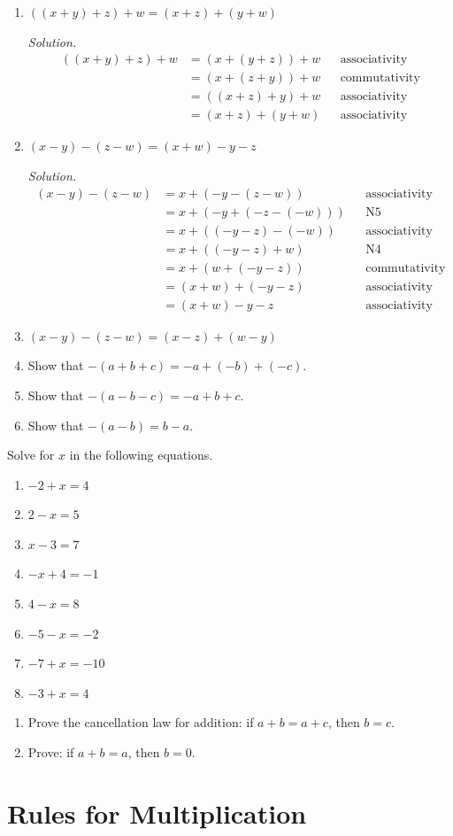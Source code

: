 \documentclass[11pt]{article}
\begin{document}
\begin{enumerate}
  \item $((x + y) + z) + w = (x + z) + (y + w)$

    \emph{Solution.}
    \begin{align*}
      ((x + y) + z) + w
        &= (x + (y + z)) + w && \text{associativity} \\
        &= (x + (z + y)) + w && \text{commutativity} \\
        &= ((x + z) + y) + w && \text{associativity} \\
        &= (x + z) + (y + w) && \text{associativity}
    \end{align*}

  \item $(x - y) - (z - w) = (x + w) - y - z$

    \emph{Solution.}
    \begin{align*}
      (x - y) - (z - w)
        &= x + (-y - (z - w)) && \text{associativity} \\
        &= x + (-y + (-z - (-w))) && \text{N5} \\
        &= x + ((-y - z) - (-w)) && \text{associativity} \\
        &= x + ((-y - z) + w) && \text{N4} \\
        &= x + (w + (-y - z)) && \text{commutativity} \\
        &= (x + w) + (-y - z) && \text{associativity} \\
        &= (x + w) - y - z && \text{associativity}
    \end{align*}

  \item $(x - y) - (z - w) = (x - z) + (w - y)$
  \item Show that $-(a + b + c) = -a + (-b) + (-c)$.
  \item Show that $-(a - b - c) = -a + b + c$.
  \item Show that $-(a - b) = b - a$.
\end{enumerate}

Solve for $x$ in the following equations.

\begin{enumerate}[resume]
  \item $-2 + x = 4$
  \item $2 - x = 5$
  \item $x - 3 = 7$
  \item $-x + 4 = -1$
  \item $4 - x = 8$
  \item $-5 - x = -2$
  \item $-7 + x = -10$
  \item $-3 + x = 4$
\end{enumerate}

\begin{enumerate}[resume]
  \item Prove the cancellation law for addition:
    if $a + b = a + c$, then $b = c$.
  \item Prove: if $a + b = a$, then $b = 0$.
\end{enumerate}

\section{Rules for Multiplication}

\end{document}
